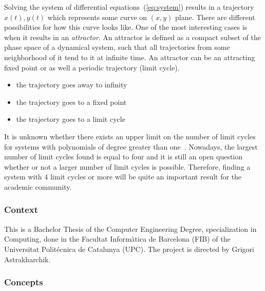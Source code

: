 Solving the system of differential equations~(\ref{eq:system}) results in a trajectory $x(t), y(t)$ which represents some curve on $(x,y)$ plane. There are different possibilities for how this curve looks like. One of the most interesting cases is when it results in an {\it attractor}. An attractor is defined as a compact subset of the phase space of a dynamical system, such that all trajectories from some neighborhood of it tend to it at infinite time. An attractor can be an attracting fixed point or as well a periodic trajectory (limit cycle).

\begin{itemize}
\item the trajectory goes away to infinity
\item the trajectory goes to a fixed point
\item the trajectory goes to a limit cycle
\end{itemize}

It is unknown whether there exists an upper limit on the number of limit cycles
for systems with polynomials of degree greater than
one~\cite{christopher_hilberts_2007,ilyashenko_centennial_2002,llibre_sobre_2015}.
Nowadays, the largest number of limit cycles found is equal to four and it is
still an open question whether or not a larger number of limit cycles is
possible. Therefore, finding a system with 4 limit cycles or more will be quite
an important result for the academic community.

%
%

\subsubsection{Context}

This is a Bachelor Thesis of the Computer Engineering Degree, specialization in
Computing, done in the \textcatalan{Facultat Inform\`atica de Barcelona (FIB)}
of the \textcatalan{Universitat Polit\'ecnica de Catalunya (UPC)}. The project
is directed by Grigori Astrakharchik.

\subsubsection{Concepts}

